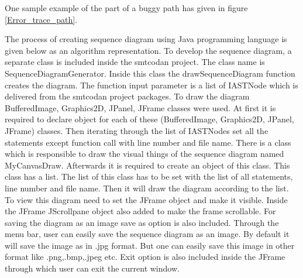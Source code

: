  One sample example of the part of a buggy path has given in figure \ref{Error_trace_path}.


The process of creating sequence diagram using Java programming language is given below as an algorithm representation. To develop the sequence diagram, a separate class is included inside the smtcodan project. The class name is SequenceDiagramGenerator. Inside this class the drawSequenceDiagram function creates the diagram. The function input parameter is a list of IASTNode which is delivered from the smtcodan project packages. To draw the diagram BufferedImage, Graphics2D, JPanel, JFrame  classes were used. At first it is required to declare object for each of these (BufferedImage, Graphics2D, JPanel, JFrame) classes. Then iterating through the list of IASTNodes set all the statements except function call with line number and file name. There is a class which is responsible to draw the visual things of the sequence diagram named MyCanvasDraw. Afterwards it is required to create an object of this class. This class has a list. The list of this class has to be set with the list of all statements, line number  and file name. Then it will draw the diagram according to the list. To view this diagram need to set the JFrame object and make it visible. Inside the JFrame JScrollpane object also added to make the frame scrollable. For saving the diagram as an image save as option is also included. Through the menu bar, user can easily save the sequence diagram as an image. By default it will save the image as in .jpg format. But one can easily save this image in other format like .png,.bmp,.jpeg etc. Exit option is also included inside the JFrame through which user can exit the current window.  



